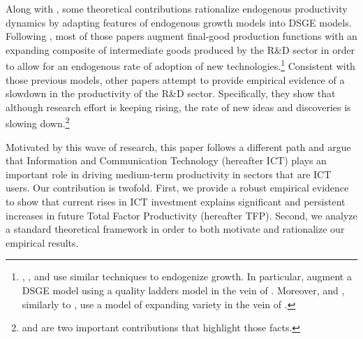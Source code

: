 \documentclass[12pt]{article}
\begin{document}
Along with \cite{comin2006medium}, some theoretical contributions rationalize endogenous productivity dynamics by adapting features of endogenous growth models into DSGE models. Following \cite{romer1990endogenous}, most of those papers augment final-good production functions with an expanding composite of intermediate goods produced by the R\&D sector in order to allow for an endogenous rate of adoption of new technologies.\footnote{\cite{bianchi2014growth}, \cite{anzoategui2016endogenous}, and \cite{moran2017innovation} use similar techniques to endogenize growth. In particular, \cite{bianchi2014growth} augment a DSGE  model using a quality ladders model in the vein of \cite{grossman1991quality}. Moreover, \cite{anzoategui2016endogenous} and \cite{moran2017innovation}, similarly to \cite{comin2006medium}, use a model of expanding variety in the vein of \cite{romer1990endogenous}.} Consistent with those previous models, other papers attempt to provide empirical evidence of a slowdown in the productivity of the R\&D sector. Specifically, they show that although research effort is keeping rising, the rate of new ideas and discoveries is slowing down.\footnote{\cite{jones2009burden} and \cite{bloom2017ideas} are two important contributions that highlight those facts.}

Motivated by this wave of research, this paper follows a different path and argue that Information and Communication Technology (hereafter ICT) plays an important role in driving medium-term productivity in sectors that are ICT users. Our contribution is twofold. First, we provide a robust empirical evidence to show that current rises in ICT investment explains significant and persistent increases in future Total Factor Productivity (hereafter TFP). Second, we analyze a standard theoretical framework in order to both motivate and rationalize our empirical results. 
\end{document}
